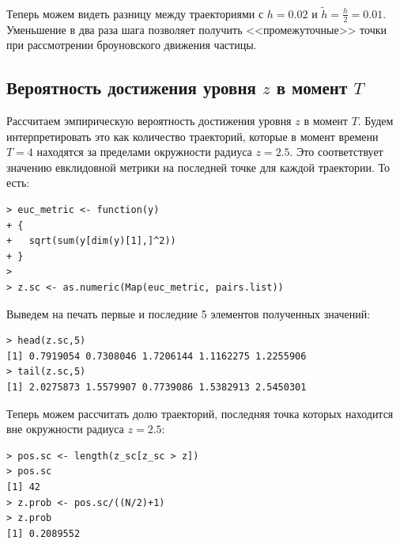 \documentclass[14pt,a4paper]{scrartcl}
\begin{document}
\begin{figure}[H]
	\begin{minipage}[h]{1\linewidth}
		  \\
	\end{minipage}
\end{figure}


Теперь можем видеть разницу между траекториями с $h = 0.02$ и ${\tilde{h} = \frac{h}{2} = 0.01}$. Уменьшение в два раза шага позволяет получить <<промежуточные>> точки при рассмотрении броуновского движения частицы.


\subsection{Вероятность достижения уровня $z$ в момент $T$}

Рассчитаем эмпирическую вероятность достижения уровня $z$ в момент $T$. Будем интерпретировать это как количество траекторий, которые в момент времени $T = 4$ находятся за пределами окружности радиуса $z = 2.5$. Это соответствует значению евклидовной метрики на последней точке для каждой траектории. То есть:

\begin{verbatim}
> euc_metric <- function(y)
+ {
+   sqrt(sum(y[dim(y)[1],]^2))
+ }
> 
> z.sc <- as.numeric(Map(euc_metric, pairs.list))
\end{verbatim}

Выведем на печать первые и последние 5 элементов полученных значений:
\begin{verbatim}
> head(z.sc,5)
[1] 0.7919054 0.7308046 1.7206144 1.1162275 1.2255906
> tail(z.sc,5)
[1] 2.0275873 1.5579907 0.7739086 1.5382913 2.5450301
\end{verbatim}

Теперь можем рассчитать долю траекторий, последняя точка которых находится вне окружности радиуса $z = 2.5$:
\begin{verbatim}
> pos.sc <- length(z_sc[z_sc > z])
> pos.sc
[1] 42
> z.prob <- pos.sc/((N/2)+1)
> z.prob
[1] 0.2089552
\end{verbatim}
\end{document}
